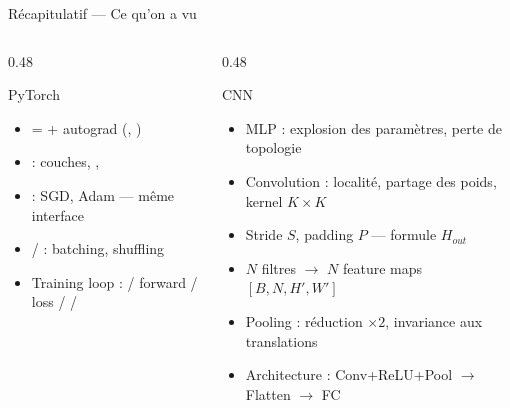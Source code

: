 \documentclass[aspectratio=169, 10pt]{beamer}
\begin{document}
\begin{frame}{Récapitulatif — Ce qu'on a vu}
  \begin{columns}[T]
    \begin{column}{0.48\textwidth}
      \begin{block}{PyTorch}
        \begin{itemize}
          \item {} =  + autograd (, )
          \item {} : couches, , 
          \item {} : SGD, Adam — même interface
          \item {} /  : batching, shuffling
          \item Training loop :  / forward / loss /  / 
        \end{itemize}
      \end{block}
    \end{column}
    \begin{column}{0.48\textwidth}
      \begin{block}{CNN}
        \begin{itemize}
          \item MLP : explosion des paramètres, perte de topologie
          \item Convolution : localité, partage des poids, kernel $K\!\times\!K$
          \item Stride $S$, padding $P$ — formule $H_{out}$
          \item $N$ filtres $\to$ $N$ feature maps $[B, N, H', W']$
          \item Pooling : réduction $\times 2$, invariance aux translations
          \item Architecture : Conv+ReLU+Pool $\to$ Flatten $\to$ FC
        \end{itemize}
      \end{block}
    \end{column}
  \end{columns}
\end{frame}
\end{document}
